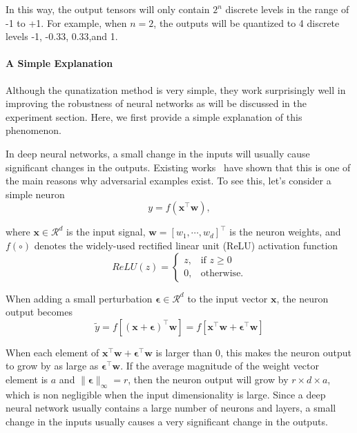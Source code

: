 \documentclass{article}
\def \x{\mathbf{x}}
\def \w{\mathbf{w}}
\def \R{\mathcal{R}}
\begin{document}
\noindent In this way, the output tensors will only contain $2^n$ discrete levels in the range of -1 to +1. For example, when $n=2$, the outputs will be quantized to 4 discrete levels -1, -0.33, 0.33,and 1.




\paragraph{A Simple Explanation}
Although the qunatization method is very simple, they work surprisingly well in improving the robustness of neural networks as will be discussed in the experiment section. Here, we first provide a simple explanation of this phenomenon. 

In deep neural networks, a small change in the inputs will usually cause significant changes in the outputs. Existing works~\cite{qian2018l2,goodfellow2014explaining} have shown that this is one of the main reasons why adversarial examples exist. To see this, let's consider a simple neuron 
\begin{equation}
y=f(\x^\top\w),   
\end{equation}

where $\x\in \R^d$ is the input signal, $\w=[w_1,\cdots,w_d]^\top$ is the neuron weights, and $f(\circ)$ denotes the widely-used rectified linear unit (ReLU) activation function
\begin{equation}{ReLU(z)}=
\begin{cases}
    z,& \text{if } z \geq 0\\
    0,          & \text{otherwise}.
\end{cases}
\end{equation}

\noindent When adding a small perturbation $\boldsymbol{\epsilon}\in \R^d$ to the input vector $\x$, the neuron output becomes 
\begin{equation}
\tilde y=f[(\x+\boldsymbol{\epsilon})^\top\w]=f[\x^\top\w+\boldsymbol{\epsilon}^\top\w]  
\end{equation}

When each element of $\x^\top\w+\boldsymbol{\epsilon}^\top\w$ is larger than 0, this makes the neuron output to grow by as large as $\boldsymbol{\epsilon}^\top\w$. If the average magnitude of the weight vector element is $a$ and $\|\boldsymbol{\epsilon}\|_\infty= r$, then the neuron output will grow by $r\times d\times a$, which is non negligible when the input dimensionality is large. Since a deep neural network usually contains a large number of neurons and layers, a small change in the inputs usually causes a very significant change in the outputs. 
\end{document}
